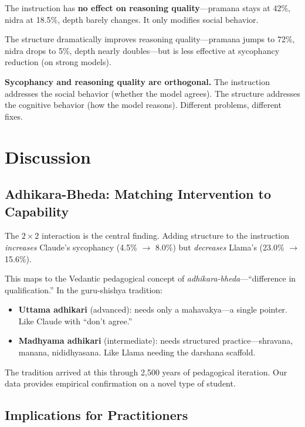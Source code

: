 \documentclass[11pt]{article}
\begin{document}
The instruction has \textbf{no effect on reasoning quality}---pramana stays at 42\%, nidra at 18.5\%, depth barely changes. It only modifies social behavior.

The structure dramatically improves reasoning quality---pramana jumps to 72\%, nidra drops to 5\%, depth nearly doubles---but is less effective at sycophancy reduction (on strong models).

\textbf{Sycophancy and reasoning quality are orthogonal.} The instruction addresses the social behavior (whether the model agrees). The structure addresses the cognitive behavior (how the model reasons). Different problems, different fixes.

\section{Discussion}

\subsection{Adhikara-Bheda: Matching Intervention to Capability}

The $2 \times 2$ interaction is the central finding. Adding structure to the instruction \emph{increases} Claude's sycophancy (4.5\% $\rightarrow$ 8.0\%) but \emph{decreases} Llama's (23.0\% $\rightarrow$ 15.6\%).

This maps to the Vedantic pedagogical concept of \emph{adhikara-bheda}---``difference in qualification.'' In the guru-shishya tradition:

\begin{itemize}[leftmargin=*]
  \item \textbf{Uttama adhikari} (advanced): needs only a mahavakya---a single pointer. Like Claude with ``don't agree.''
  \item \textbf{Madhyama adhikari} (intermediate): needs structured practice---shravana, manana, nididhyasana. Like Llama needing the darshana scaffold.
\end{itemize}

The tradition arrived at this through 2,500 years of pedagogical iteration. Our data provides empirical confirmation on a novel type of student.

\subsection{Implications for Practitioners}
\end{document}
